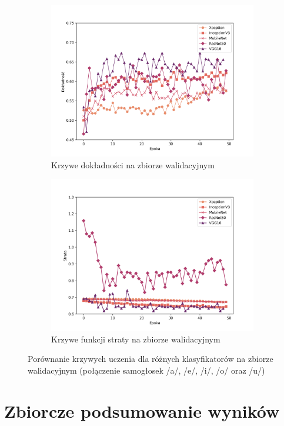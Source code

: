 \begin{figure}[ht]
    \centering
    \begin{subfigure}{0.49\textwidth}
        \centering
        \includegraphics[width=\textwidth]{./img/results/all_acc}
        \caption{Krzywe dokładności na zbiorze walidacyjnym\@}
        \label{fig:vowels_acc}
    \end{subfigure}
    \begin{subfigure}{0.49\textwidth}
        \centering
        \includegraphics[width=\textwidth]{./img/results/all_loss}
        \caption{Krzywe funkcji straty na zbiorze walidacyjnym\@}
        \label{fig:vowels_loss}
    \end{subfigure}

    \caption{Porównanie krzywych uczenia dla różnych klasyfikatorów na zbiorze walidacyjnym (połączenie samogłosek /a/, /e/, /i/, /o/ oraz /u/)}
    \label{fig:vowels_results}
\end{figure}

\section{Zbiorcze podsumowanie wyników}
\label{sec:podsumowanie-wynikow}